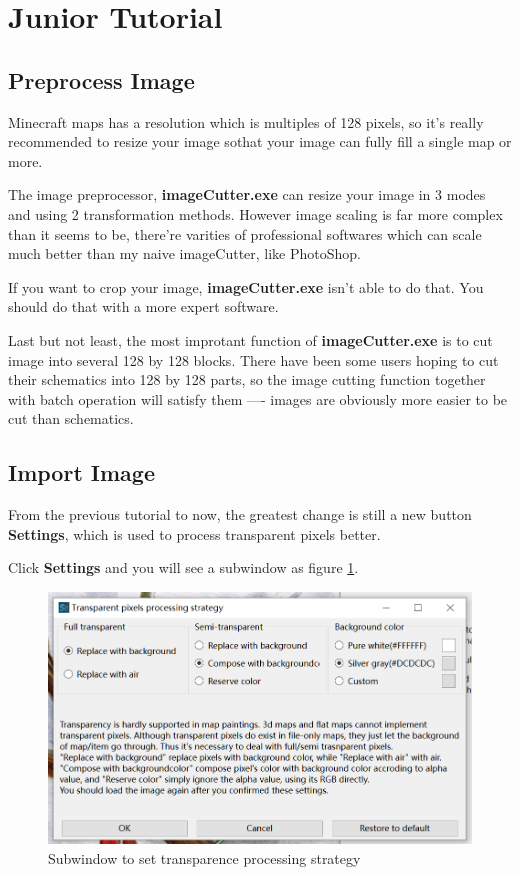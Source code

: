 \documentclass{article}
\begin{document}
    \pagebreak
    \section{Junior Tutorial}

    \subsection{Preprocess Image}
    Minecraft maps has a resolution which is multiples of 128 pixels, so it's really recommended to resize your image sothat your image can fully fill a single map or more.

    The image preprocessor, \textbf{imageCutter.exe} can resize your image in 3 modes and using 2 transformation methods. However image scaling is far more complex than it seems to be, there're varities of professional softwares which can scale much better than my naive imageCutter, like PhotoShop.

    If you want to crop your image, \textbf{imageCutter.exe} isn't able to do that. You should do that with a more expert software.

    Last but not least, the most improtant function of \textbf{imageCutter.exe} is to cut image into several 128 by 128 blocks. There have been some users hoping to cut their schematics into 128 by 128 parts, so the image cutting function together with batch operation will satisfy them ---- images are obviously more easier to be cut than schematics.

    \subsection{Import Image}
    From the previous tutorial to now, the greatest change is still a new button \textbf{Settings}, which is used to process transparent pixels better.
 
    Click \textbf{Settings} and you will see a subwindow as figure \ref*{SetTPS}.

    \begin{figure}[htbp]
        \centering
        \includegraphics[width=15cm]{Img1_TPS.png}
        \caption{Subwindow to set transparence processing strategy}
        \label{SetTPS}
    \end{figure}
    
\end{document}
